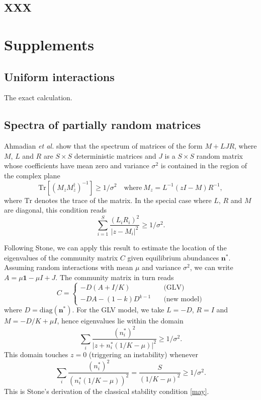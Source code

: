 \documentclass[12pt]{article}
\begin{document}
\subsection{XXX}

\section{Supplements}

\subsection{Uniform interactions}

The exact calculation. 

\subsection{Spectra of partially random matrices}

Ahmadian \emph{et al.} show that the spectrum of matrices of the form $M + LJR$, where $M$,  $L$ and $R$ are $S\times S$ deterministic matrices and $J$ is a $S\times S$ random matrix whose coefficients have mean zero and variance $\sigma^2$ is contained in the region of the complex plane 
\begin{equation}
    \textrm{Tr}[(M_zM_z^\dagger)^{-1}]\geq 1/\sigma^2 \quad \textrm{where}\ M_z = L^{-1}(zI - M)R^{-1}, 
\end{equation}
where $\textrm{Tr}$ denotes the trace of the matrix. In the special case where $L$, $R$ and $M$ are diagonal, this condition reads
\begin{equation}
    \sum_{i=1}^S\frac{(L_{i}R_{i})^2}{ \vert z - M_{i}\vert^2 }\geq 1/\sigma^2.
\end{equation}

Following Stone, we can apply this result to estimate the location of the eigenvalues of the community matrix $C$ given equilibrium abundances $\mathbf{n}^*$. Assuming random interactions with mean $\mu$ and variance $\sigma^2$, we can write $A = \mu \mathbf{1} - \mu I + J$. The community matrix in turn reads 
\begin{equation}
    C = \begin{cases}
        -D(A + I/K)\quad&\text{(GLV)}\\
        -D A - (1-k)D^{k-1}\quad&\text{(new model)} 
    \end{cases}
\end{equation}
where $D = \textrm{diag}(\mathbf{n}^*)$. For the GLV model, we take $L = -
D$, $R = I$ and $M = - D/K + \mu I$, hence eigenvalues lie within the domain
\begin{equation}
\sum_{i} \frac{(n_i^*)^2}{\vert z + n_i^*(1/K - \mu)\vert ^2}\geq 1/\sigma^2. 
\end{equation} 
This domain touches $z = 0$ (triggering an instability) whenever
\begin{equation}
    \sum_i \frac{(n_i^*)^2}{(n_i^*(1/K - \mu))^2} = \frac{S}{(1/K - \mu)^2} \geq 1/\sigma^2.
\end{equation}
This is Stone's derivation of the classical stability condition \eqref{may}. 
\end{document}
